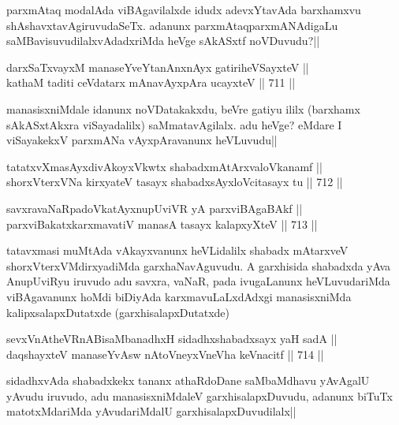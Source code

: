 \begin{artha} 
parxmAtaq modalAda viBAgavilalxde idudx adevxYtavAda barxhamxvu 
shAshavxtavAgiruvudaSeTx. adanunx parxmAtaqparxmANAdigaLu 
saMBavisuvudilalxvAdadxriMda heVge sAkASxtf noVDuvudu?||
\end{artha}


\begin{shl}
darxSaTxvayxM manaseYveYtanAnxnAyx gatiriheVSayxteV || \\
kathaM taditi ceVdatarx mAnavAyxpAra ucayxteV ||  711 ||  
\end{shl}

\begin{artha} 
manasisxniMdale idanunx noVDatakakxdu, beVre gatiyu ililx (barxhamx 
sAkASxtAkxra viSayadalilx) saMmatavAgilalx. adu heVge? eMdare I 
viSayakekxV parxmANa vAyxpAravanunx heVLuvudu||
\end{artha}

\begin{shl}
tatatxvXmasAyxdivAkoyxVkwtx shabadxmAtArxvaloVkanamf || \\
shorxVterxVNa kirxyateV tasayx shabadxsAyx\s \s loVcitasayx tu ||  712 ||  
\end{shl}
				
\begin{shl}
savxravaNaRpadoVkatAyx\s \s nupUviVR yA parxviBAgaBAkf || \\
parxviBakatxkarxmavatiV manasA tasayx kalapxyXteV ||  713 ||  
\end{shl}

\begin{artha} 
tatavxmasi muMtAda vAkayxvanunx heVLidalilx shabadx mAtarxveV 
shorxVterxVMdirxyadiMda garxhaNavAguvudu. A garxhisida shabadxda yAva 
AnupUviRyu iruvudo adu savxra, vaNaR, pada ivugaLanunx heVLuvudariMda 
viBAgavanunx hoMdi biDiyAda karxmavuLaLxdAdxgi manasisxniMda 
kalipxsalapxDutatxde (garxhisalapxDutatxde)
\end{artha}

\begin{shl}
sevxVnAtheVRnABisaMbanadhxH sidadhxshabadxsayx yaH sadA || \\
daqshayxteV manaseYvAsw nAtoV\s neyxVneVha keVnacitf ||  714 ||  
\end{shl}

\begin{artha} 
sidadhxvAda shabadxkekx tananx athaRdoDane saMbaMdhavu yAvAgalU yAvudu 
iruvudo, adu manasisxniMdaleV garxhisalapxDuvudu, adanunx biTuTx 
matotxMdariMda yAvudariMdalU garxhisalapxDuvudilalx||
\end{artha}


